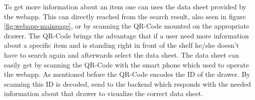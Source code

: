 To get more information about an item one can uses the data sheet provided by the webapp. 
This can directly reached from the search result, also seen in figure \ref{fig:webapp-mainpage}, or by scanning the QR-Code mounted on the appropriate drawer. 
The QR-Code brings the advantage that if a user need more information about a specific item and is standing right in front of the shelf he/she doesn't have to search again and afterwards select the data sheet. 
The data sheet can easily get by scanning the QR-Code with the smart phone which used to operate the webapp. 
As mentioned before the QR-Code encodes the ID of the drawer. 
By scanning this ID is decoded, send to the backend which responds with the needed information about that drawer to visualize the correct data sheet. 